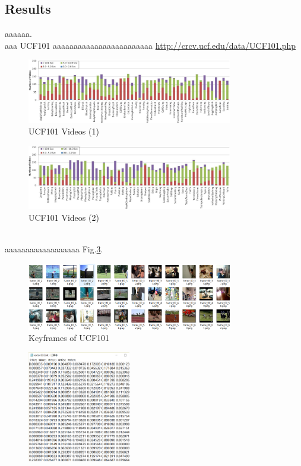 \documentclass[a4paper,12pt,UTF8]{ctexart}
\begin{document}
\begin{spacing}{1.1}
\subsection{Results}
\indent aaaaaa.
\\\indent aaa UCF101 \cite{DBLP:journals/corr/abs-1212-0402} aaaaaaaaaaaaaaaaaaaaaaaa \url{http://crcv.ucf.edu/data/UCF101.php}
\begin{figure}[h]
	\centering
	\includegraphics[width=0.8\textwidth]{101a.png}
	\caption{UCF101 Videos (1)}
	\label{101a}
\end{figure}
\begin{figure}[h]
	\centering
	\includegraphics[width=0.8\textwidth]{101b.png}
	\caption{UCF101 Videos (2)}
	\label{101b}
\end{figure}
\\\indent aaaaaaaaaaaaaaaaaa Fig.\ref{frame}.
\begin{figure}[h]
	\centering
	\includegraphics[width=0.8\textwidth]{frame.png}
	\caption{Keyframes of UCF101}
	\label{frame}
\end{figure}
\begin{figure}[h]
	\centering
	\includegraphics[width=0.4\textwidth]{vector1.png}

\end{figure}
\end{spacing}
\end{document}
